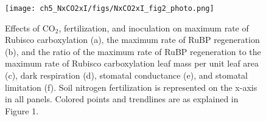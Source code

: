 \newpage
\begin{figure}
    \centering
    \texttt{[image: ch5\_NxCO2xI/figs/NxCO2xI\_fig2\_photo.png]}
    \caption[Effects of CO$_2$, fertilization, and inoculation on maximum rate of Rubisco carboxylation, the maximum rate of RuBP regeneration, and the ratio of the maximum rate of RuBP regeneration to the maximum rate of Rubisco carboxylation leaf mass per unit leaf area, dark respiration, stomatal conductance, and stomatal limitation.]{Effects of CO$_2$, fertilization, and inoculation on maximum rate of Rubisco carboxylation (a), the maximum rate of RuBP regeneration (b), and the ratio of the maximum rate of RuBP regeneration to the maximum rate of Rubisco carboxylation leaf mass per unit leaf area (c), dark respiration (d), stomatal conductance (e), and stomatal limitation (f). Soil nitrogen fertilization is represented on the x-axis in all panels. Colored points and trendlines are as explained in Figure 1.}
    \label{fig:figure5.2}
\end{figure}
\clearpage

